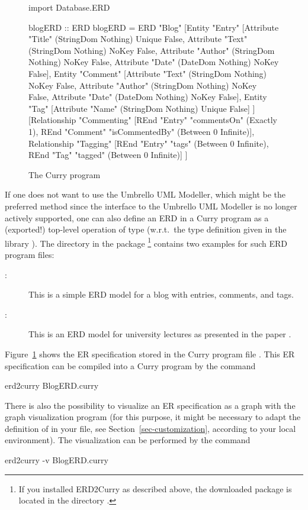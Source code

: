 %
\begin{figure}[t]
\begin{curry}
import Database.ERD

blogERD :: ERD
blogERD =
 ERD "Blog" 
     [Entity "Entry" 
          [Attribute "Title"  (StringDom Nothing) Unique False, 
           Attribute "Text"   (StringDom Nothing) NoKey  False,
           Attribute "Author" (StringDom Nothing) NoKey  False,
           Attribute "Date"   (DateDom   Nothing) NoKey  False],
      Entity "Comment"
        [Attribute "Text"   (StringDom Nothing) NoKey False,
         Attribute "Author" (StringDom Nothing) NoKey False,
         Attribute "Date"   (DateDom   Nothing) NoKey False],
      Entity "Tag"
        [Attribute "Name" (StringDom Nothing) Unique False]
     ]
     [Relationship "Commenting"
       [REnd "Entry"   "commentsOn"    (Exactly 1),
        REnd "Comment" "isCommentedBy" (Between 0 Infinite)],
      Relationship "Tagging"
       [REnd "Entry" "tags" (Between 0 Infinite),
        REnd "Tag" "tagged" (Between 0 Infinite)]
     ]
\end{curry}
\caption{The Curry program \label{fig:blogerdcurry}}
\end{figure}

If one does not want to use the Umbrello UML Modeller,
which might be the preferred method since the interface to the
Umbrello UML Modeller is no longer actively supported,
one can also define an ERD in a Curry program as a (exported!)
top-level operation of type 
(w.r.t.\ the type definition given in the library
).
%
The directory  in the package \footnote{%
If you installed ERD2Curry as described above,
the downloaded  package is located in the directory
.}
contains two examples for such ERD program files:
\begin{description}
\item[:]
This is a simple ERD model for a blog with entries, comments,
and tags.
\item[:]
This is an ERD model for university lectures as
presented in the paper \cite{BrasselHanusMueller08PADL}.
\end{description}
%
Figure~\ref{fig:blogerdcurry} shows the ER specification
stored in the Curry program file .
This ER specification can be compiled into a Curry program by the
command
\begin{curry}
erd2curry BlogERD.curry
\end{curry}
%
There is also the possibility to visualize an ER specification
as a graph with the graph visualization program 
(for this purpose, it might be necessary to adapt the definition
of  in your \ccode{\curryrc} file,
see Section~\ref{sec-customization},
according to your local environment).
The visualization can be performed by the command
\begin{curry}
erd2curry -v BlogERD.curry
\end{curry}


